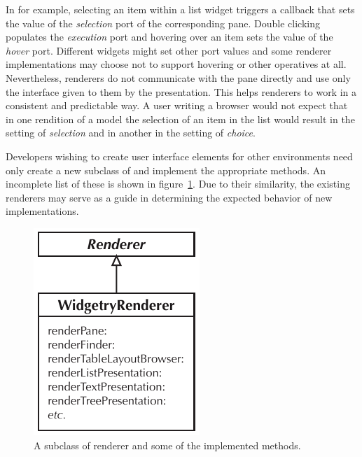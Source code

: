 \documentclass[a4paper,10pt,twoside]{book}
\begin{document}
In  for example, selecting an item within a list widget triggers a callback that sets the value of the \emph{selection} port of the corresponding pane. Double clicking populates the \emph{execution} port and hovering over an item sets the value of the \emph{hover} port. Different widgets might set other port values and some renderer implementations may choose not to support hovering or other operatives at all. Nevertheless, renderers do not communicate with the pane directly and use only the interface given to them by the presentation. This helps renderers to work in a consistent and predictable way. A user writing a browser would not expect that in one rendition of a model the selection of an item in the list would result in the setting of \emph{selection} and in another in the setting of \emph{choice}.

Developers wishing to create user interface elements for other environments need only create a new subclass of  and implement the appropriate methods. An incomplete list of these is shown in figure~\ref{fig:renderer}. Due to their similarity, the existing renderers may serve as a guide in determining the expected behavior of new implementations.

\begin{figure}[htbp]
\centerline{\includegraphics[width=\linewidth]{renderer.pdf}}
\caption{A subclass of renderer and some of the implemented methods.}
\label{fig:renderer}
\end{figure}
\end{document}
